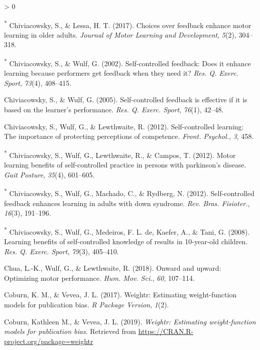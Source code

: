 \documentclass[
  english,
  man,floatsintext]{apa7}
\newlength{\cslhangindent}
\newenvironment{CSLReferences}[2] %
 {%
  \setlength{\parindent}{0pt}
  \ifodd #1 \everypar{\setlength{\hangindent}{\cslhangindent}}\ignorespaces\fi
  \ifnum #2 > 0
  \setlength{\parskip}{#2\baselineskip}
  \fi
 }%
 {}
\begin{document}
\begin{CSLReferences}{1}{0}
\leavevmode\hypertarget{ref-Chiviacowsky2017-fy}{}%
\textsuperscript{*} Chiviacowsky, S., \& Lessa, H. T. (2017). Choices over feedback enhance motor learning in older adults. \emph{Journal of Motor Learning and Development}, \emph{5}(2), 304--318.

\leavevmode\hypertarget{ref-Chiviacowsky2002-ep}{}%
\textsuperscript{*} Chiviacowsky, S., \& Wulf, G. (2002). Self-controlled feedback: Does it enhance learning because performers get feedback when they need it? \emph{Res. Q. Exerc. Sport}, \emph{73}(4), 408--415.

\leavevmode\hypertarget{ref-Chiviacowsky2005-iq}{}%
Chiviacowsky, S., \& Wulf, G. (2005). Self-controlled feedback is effective if it is based on the learner's performance. \emph{Res. Q. Exerc. Sport}, \emph{76}(1), 42--48.

\leavevmode\hypertarget{ref-Chiviacowsky2012-cw}{}%
Chiviacowsky, S., Wulf, G., \& Lewthwaite, R. (2012). Self-controlled learning: The importance of protecting perceptions of competence. \emph{Front. Psychol.}, \emph{3}, 458.

\leavevmode\hypertarget{ref-Chiviacowsky2012-ri}{}%
\textsuperscript{*} Chiviacowsky, S., Wulf, G., Lewthwaite, R., \& Campos, T. (2012). Motor learning benefits of self-controlled practice in persons with parkinson's disease. \emph{Gait Posture}, \emph{35}(4), 601--605.

\leavevmode\hypertarget{ref-Chiviacowsky2012-pk}{}%
\textsuperscript{*} Chiviacowsky, S., Wulf, G., Machado, C., \& Rydberg, N. (2012). Self-controlled feedback enhances learning in adults with down syndrome. \emph{Rev. Bras. Fisioter.}, \emph{16}(3), 191--196.

\leavevmode\hypertarget{ref-Chiviacowsky2008-bj}{}%
\textsuperscript{*} Chiviacowsky, S., Wulf, G., Medeiros, F. L. de, Kaefer, A., \& Tani, G. (2008). Learning benefits of self-controlled knowledge of results in 10-year-old children. \emph{Res. Q. Exerc. Sport}, \emph{79}(3), 405--410.

\leavevmode\hypertarget{ref-Chua2018-sn}{}%
Chua, L.-K., Wulf, G., \& Lewthwaite, R. (2018). Onward and upward: Optimizing motor performance. \emph{Hum. Mov. Sci.}, \emph{60}, 107--114.

\leavevmode\hypertarget{ref-Coburn2017-hv}{}%
Coburn, K. M., \& Vevea, J. L. (2017). Weightr: Estimating weight-function models for publication bias. \emph{R Package Version}, \emph{1}(2).

\leavevmode\hypertarget{ref-R-weightr}{}%
Coburn, Kathleen M., \& Vevea, J. L. (2019). \emph{Weightr: Estimating weight-function models for publication bias}. Retrieved from \url{https://CRAN.R-project.org/package=weightr}


\end{CSLReferences}
\end{document}
